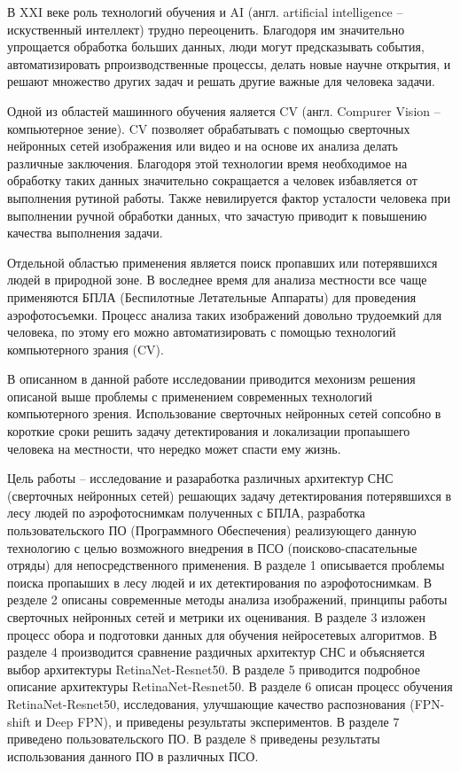 
В XXI веке роль технологий обучения и AI (англ. artificial intelligence -- искуственный интеллект) трудно переоценить. Благодоря им значительно упрощается обработка больших данных, люди могут предсказывать события, автоматизировать рпроизводственные процессы, делать новые научне открытия, и решают множество других задач и решать другие важные для человека задачи.

Одной из областей машинного обучения яаляется CV (англ. Compurer Vision -- компьютерное зение). CV позволяет обрабатывать с помощью сверточных нейронных сетей изображения или видео и на основе их анализа делать различные заключения. Благодоря этой технологии время необходимое на обработку таких данных значительно сокращается а человек избавляется от выполнения рутиной работы. Также невилируется фактор усталости человека при выполнении ручной обработки данных, что зачастую приводит к повышению качества выполнения задачи.

Отдельной областью применения является поиск пропавших или потерявшихся людей в природной зоне. В воследнее время для анализа местности все чаще применяются БПЛА (Беспилотные Летательные Аппараты) для проведения аэрофотосъемки. Процесс анализа таких изображений довольно трудоемкий для человека, по этому его можно автоматизировать с помощью технологий компьютерного зрания (CV). 

В описанном в данной работе исследовании приводится мехонизм решения описаной выше проблемы с применением современных технологий компьютерного зрения. Использование сверточных нейронных сетей сопсобно в короткие сроки решить задачу детектирования и локализации пропаышего человека на местности, что нередко может спасти ему жизнь. 

Цель работы -- исследование и разаработка различных архитектур СНС (сверточных нейронных сетей) решающих задачу детектирования потерявшихся в лесу людей по аэрофотоснимкам полученных с БПЛА, разработка пользовательского ПО (Программного Обеспечения) реализующего данную технологию с целью возможного внедрения в ПСО (поисково-спасательные отряды) для непосредственного применения. В разделе 1 описывается проблемы поиска пропаыших в лесу людей и их детектирования по аэрофотоснимкам. В резделе 2 описаны современные методы анализа изображений, принципы работы сверточных нейронных сетей и метрики их оценивания. В разделе 3 изложен процесс обора и подготовки данных для обучения нейросетевых алгоритмов. В разделе 4 производится сравнение раздичных архитектур СНС и объясняется выбор архитектуры RetinaNet-Resnet50. В разделе 5 приводится подробное описание архитектуры RetinaNet-Resnet50. В разделе 6 описан процесс обучения RetinaNet-Resnet50, исследования, улучшающие качество распознования (FPN-shift и Deep FPN), и приведены результаты экспериментов. В разделе 7 приведено пользовательского ПО. В разделе 8 приведены результаты использования данного ПО в различных ПСО.
\clearpage